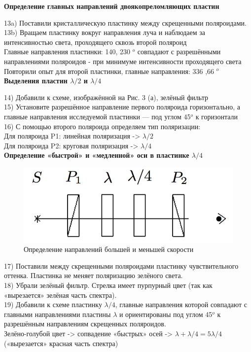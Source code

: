 \documentclass[a4paper,12pt]{article} %
\begin{document}
\textbf{Определение главных направлений двоякопреломляющих пластин}

	
 13a) Поставили кристаллическую пластинку между скрещенными поляроидами.\\
 13b) Вращаем пластинку вокруг направления луча и наблюдаем за интенсивностью света, проходящего сквозь второй поляроид\\
 Главные направления пластинки: 140, 230 $^o$ совпадают с разрешёнными направлениями поляроидов - при минимуме интенсивности проходящего света
 Повторили опыт для второй пластинки, главные направления: 336 ,66 $^o$\\

\textbf{Выделения пластин $\lambda/2$ и $\lambda/4$}

 14) Добавили к схеме, изображённой на Рис. 3 (а), зелёный фильтр\\
 15) Установите разрешённое направление первого поляроида горизонтально, а главные направления исследуемой пластинки — под углом 45$^o$ к горизонтали\\
 16) С помощью второго поляроида определяем тип поляризации: \\
	 Для поляроида P1: линейная поляризация -> $\lambda/2$ \\
		Для поляроида P2: круговая поляризация -> $\lambda/4$ \\ 
	

\textbf{Определение «быстрой» и «медленной» оси в пластинке $\lambda/4$}
\begin{figure}[H]
	\centering
	\includegraphics[width = 10 cm]{6.png}
	\caption{Определение направлений большей и меньшей скорости}
\end{figure}

 17) Поставили между скрещенными поляроидами пластинку чувствительного оттенка. Пластинка не меняет поляризацию зелёного света.\\
 18) Убрали зелёный фильтр. Стрелка имеет пурпурный цвет (так как «вырезается» зелёная часть спектра).\\
 19) Добавили к схеме пластинку $\lambda/4$, главные направления которой совпадают с главными направлениями пластины $\lambda$ и ориентированы под углом 45$^o$ к разрешённым направлениям скрещенных поляроидов.\\
 Зелёно-голубой цвет -> сопвадение «быстрых» осей -> $\lambda+\lambda/4 = 5\lambda/4$  \\(«вырезается» красная часть спектра)
	
\end{document}
